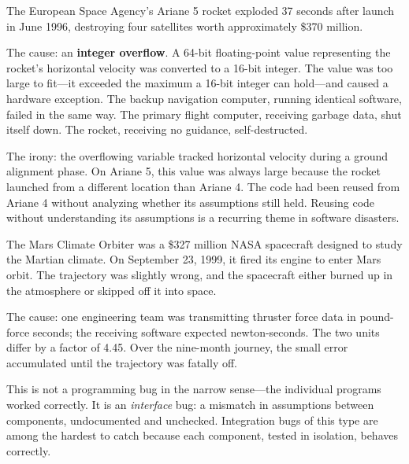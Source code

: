 \documentclass[11pt,letterpaper]{article}
\newcommand{\keyterm}[1]{\textbf{\textcolor{cssecondary}{#1}}}
\begin{document}
\begin{historybox}
The European Space Agency's Ariane 5 rocket exploded 37 seconds after launch in June 1996, destroying four satellites worth approximately \$370 million.

The cause: an \keyterm{integer overflow}. A 64-bit floating-point value representing the rocket's horizontal velocity was converted to a 16-bit integer. The value was too large to fit---it exceeded the maximum a 16-bit integer can hold---and caused a hardware exception. The backup navigation computer, running identical software, failed in the same way. The primary flight computer, receiving garbage data, shut itself down. The rocket, receiving no guidance, self-destructed.

The irony: the overflowing variable tracked horizontal velocity during a ground alignment phase. On Ariane 5, this value was always large because the rocket launched from a different location than Ariane 4. The code had been reused from Ariane 4 without analyzing whether its assumptions still held. Reusing code without understanding its assumptions is a recurring theme in software disasters.
\end{historybox}

\begin{historybox}
The Mars Climate Orbiter was a \$327 million NASA spacecraft designed to study the Martian climate. On September 23, 1999, it fired its engine to enter Mars orbit. The trajectory was slightly wrong, and the spacecraft either burned up in the atmosphere or skipped off it into space.

The cause: one engineering team was transmitting thruster force data in pound-force seconds; the receiving software expected newton-seconds. The two units differ by a factor of 4.45. Over the nine-month journey, the small error accumulated until the trajectory was fatally off.

This is not a programming bug in the narrow sense---the individual programs worked correctly. It is an \textit{interface} bug: a mismatch in assumptions between components, undocumented and unchecked. Integration bugs of this type are among the hardest to catch because each component, tested in isolation, behaves correctly.
\end{historybox}
\end{document}

